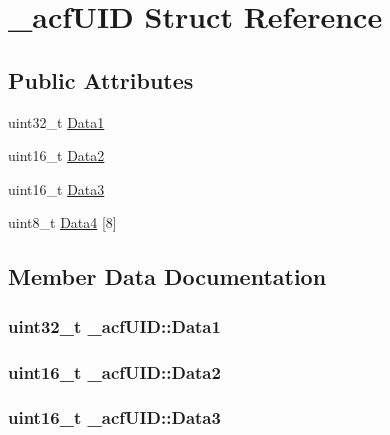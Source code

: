 \hypertarget{a00008}{}\section{\+\_\+acf\+U\+I\+D Struct Reference}
\label{a00008}
\subsection*{Public Attributes}
\begin{DoxyCompactItemize}
\item 
uint32\+\_\+t \hyperlink{a00008_a0fdbc775b496913371bea67f64096709}{Data1}
\item 
uint16\+\_\+t \hyperlink{a00008_a9e816d2f417cde4bd5173e350b68f27c}{Data2}
\item 
uint16\+\_\+t \hyperlink{a00008_af70c96a9f1b553abf206e7d5037c0e0e}{Data3}
\item 
uint8\+\_\+t \hyperlink{a00008_aefd8884cd99d91f3213573876983b0ed}{Data4} \mbox{[}8\mbox{]}
\end{DoxyCompactItemize}


\subsection{Member Data Documentation}
\hypertarget{a00008_a0fdbc775b496913371bea67f64096709}{}
\subsubsection[{Data1}]{\setlength{\rightskip}{0pt plus 5cm}uint32\+\_\+t \+\_\+acf\+U\+I\+D\+::\+Data1}\label{a00008_a0fdbc775b496913371bea67f64096709}
\hypertarget{a00008_a9e816d2f417cde4bd5173e350b68f27c}{}
\subsubsection[{Data2}]{\setlength{\rightskip}{0pt plus 5cm}uint16\+\_\+t \+\_\+acf\+U\+I\+D\+::\+Data2}\label{a00008_a9e816d2f417cde4bd5173e350b68f27c}
\hypertarget{a00008_af70c96a9f1b553abf206e7d5037c0e0e}{}
\subsubsection[{Data3}]{\setlength{\rightskip}{0pt plus 5cm}uint16\+\_\+t \+\_\+acf\+U\+I\+D\+::\+Data3}\label{a00008_af70c96a9f1b553abf206e7d5037c0e0e}
\hypertarget{a00008_aefd8884cd99d91f3213573876983b0ed}{}
